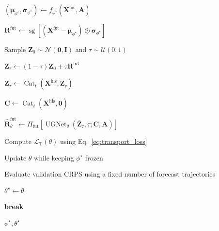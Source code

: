\documentclass[sigconf, anonymous, review]{acmart}
\begin{document}
\begin{algorithm}[h]
\begin{algorithmic}[1]
        \State $(\boldsymbol{\mu}_{\phi^{\star}},
        \boldsymbol{\sigma}_{\phi^{\star}})
        \gets
        f_{\phi^{\star}}
        (\mathbf{X}^{\mathrm{his}},\mathbf{A})$

        \State $\mathbf{R}^{\mathrm{fut}}
        \gets
        \operatorname{sg}
        \left[
        \left(
        \mathbf{X}^{\mathrm{fut}}
        -
        \boldsymbol{\mu}_{\phi^{\star}}
        \right)
        \oslash
        \boldsymbol{\sigma}_{\phi^{\star}}
        \right]$

        \State Sample
        $\mathbf{Z}_{0}
        \sim
        \mathcal{N}(\mathbf{0},\mathbf{I})$
        and
        $\tau\sim\mathcal{U}(0,1)$

        \State $\mathbf{Z}_{\tau}
        \gets
        (1-\tau)\mathbf{Z}_{0}
        +
        \tau\mathbf{R}^{\mathrm{fut}}$

        \State $\overline{\mathbf{Z}}_{\tau}
        \gets
        \operatorname{Cat}_{t}
        \left(
        \mathbf{X}^{\mathrm{his}},
        \mathbf{Z}_{\tau}
        \right)$

        \State $\mathbf{C}
        \gets
        \operatorname{Cat}_{t}
        \left(
        \mathbf{X}^{\mathrm{his}},
        \mathbf{0}
        \right)$

        \State $\widehat{\mathbf{R}}_{\theta}^{\mathrm{fut}}
        \gets
        \Pi_{\mathrm{fut}}
        \left[
        \operatorname{UGNet}_{\theta}
        \left(
        \overline{\mathbf{Z}}_{\tau},
        \tau;
        \mathbf{C},
        \mathbf{A}
        \right)
        \right]$

        \State Compute
        $\mathcal{L}_{\mathrm{T}}(\theta)$
        using Eq.~\eqref{eq:transport_loss}

        \State Update $\theta$ while keeping
        $\phi^{\star}$ frozen

    \EndFor

    \State Evaluate validation CRPS using a fixed
    number of forecast trajectories

        \State $\theta^{\star}\gets\theta$
    \EndIf

        \State \textbf{break}
    \EndIf

\EndFor

\State \Return $\phi^{\star},\theta^{\star}$

\end{algorithmic}
\end{algorithm}
\end{document}
